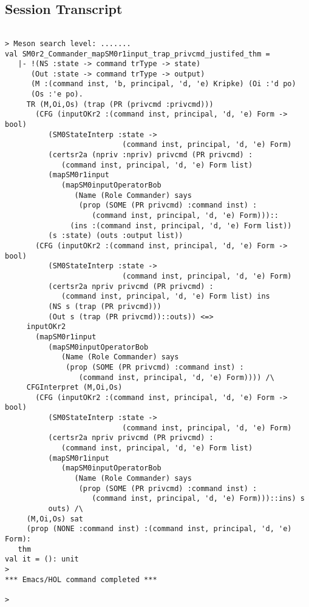 \documentclass{report}
\begin{document}
\subsection{Session Transcript}
\label{trans3}
\begin{session}
  \begin{scriptsize}
\begin{verbatim}

> Meson search level: .......
val SM0r2_Commander_mapSM0r1input_trap_privcmd_justifed_thm =
   |- !(NS :state -> command trType -> state)
      (Out :state -> command trType -> output)
      (M :(command inst, 'b, principal, 'd, 'e) Kripke) (Oi :'d po)
      (Os :'e po).
     TR (M,Oi,Os) (trap (PR (privcmd :privcmd)))
       (CFG (inputOKr2 :(command inst, principal, 'd, 'e) Form -> bool)
          (SM0StateInterp :state ->
                           (command inst, principal, 'd, 'e) Form)
          (certsr2a (npriv :npriv) privcmd (PR privcmd) :
             (command inst, principal, 'd, 'e) Form list)
          (mapSM0r1input
             (mapSM0inputOperatorBob
                (Name (Role Commander) says
                 (prop (SOME (PR privcmd) :command inst) :
                    (command inst, principal, 'd, 'e) Form)))::
               (ins :(command inst, principal, 'd, 'e) Form list))
          (s :state) (outs :output list))
       (CFG (inputOKr2 :(command inst, principal, 'd, 'e) Form -> bool)
          (SM0StateInterp :state ->
                           (command inst, principal, 'd, 'e) Form)
          (certsr2a npriv privcmd (PR privcmd) :
             (command inst, principal, 'd, 'e) Form list) ins
          (NS s (trap (PR privcmd)))
          (Out s (trap (PR privcmd))::outs)) <=>
     inputOKr2
       (mapSM0r1input
          (mapSM0inputOperatorBob
             (Name (Role Commander) says
              (prop (SOME (PR privcmd) :command inst) :
                 (command inst, principal, 'd, 'e) Form)))) /\
     CFGInterpret (M,Oi,Os)
       (CFG (inputOKr2 :(command inst, principal, 'd, 'e) Form -> bool)
          (SM0StateInterp :state ->
                           (command inst, principal, 'd, 'e) Form)
          (certsr2a npriv privcmd (PR privcmd) :
             (command inst, principal, 'd, 'e) Form list)
          (mapSM0r1input
             (mapSM0inputOperatorBob
                (Name (Role Commander) says
                 (prop (SOME (PR privcmd) :command inst) :
                    (command inst, principal, 'd, 'e) Form)))::ins) s
          outs) /\
     (M,Oi,Os) sat
     (prop (NONE :command inst) :(command inst, principal, 'd, 'e) Form):
   thm
val it = (): unit
> 
*** Emacs/HOL command completed ***

> 

\end{verbatim}
  \end{scriptsize}
\end{session}
\end{document}
